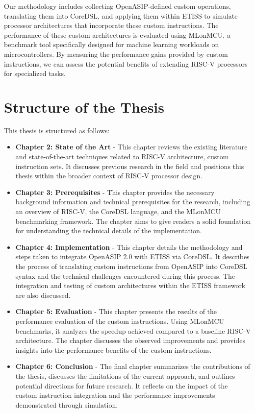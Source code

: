 Our methodology includes collecting OpenASIP-defined custom operations, translating them into CoreDSL, and applying them within ETISS to simulate processor architectures that incorporate these custom instructions. The performance of these custom architectures is evaluated using MLonMCU, a benchmark tool specifically designed for machine learning workloads on microcontrollers. By measuring the performance gains provided by custom instructions, we can assess the potential benefits of extending RISC-V processors for specialized tasks.

\section{Structure of the Thesis}
This thesis is structured as follows:

\begin{itemize}

    \item \textbf{Chapter 2: State of the Art} - This chapter reviews the existing literature and state-of-the-art techniques related to RISC-V architecture, custom instruction sets. It discusses previous research in the field and positions this thesis within the broader context of RISC-V processor design.

    \item \textbf{Chapter 3: Prerequisites} - This chapter provides the necessary background information and technical prerequisites for the research, including an overview of RISC-V, the CoreDSL language, and the MLonMCU benchmarking framework. The chapter aims to give readers a solid foundation for understanding the technical details of the implementation.

    \item \textbf{Chapter 4: Implementation} - This chapter details the methodology and steps taken to integrate OpenASIP 2.0 with ETISS via CoreDSL. It describes the process of translating custom instructions from OpenASIP into CoreDSL syntax and the technical challenges encountered during this process. The integration and testing of custom architectures within the ETISS framework are also discussed.

    \item \textbf{Chapter 5: Evaluation} - This chapter presents the results of the performance evaluation of the custom instructions. Using MLonMCU benchmarks, it analyzes the speedup achieved compared to a baseline RISC-V architecture. The chapter discusses the observed improvements and provides insights into the performance benefits of the custom instructions.

    \item \textbf{Chapter 6: Conclusion} - The final chapter summarizes the contributions of the thesis, discusses the limitations of the current approach, and outlines potential directions for future research. It reflects on the impact of the custom instruction integration and the performance improvements demonstrated through simulation.
\end{itemize}
